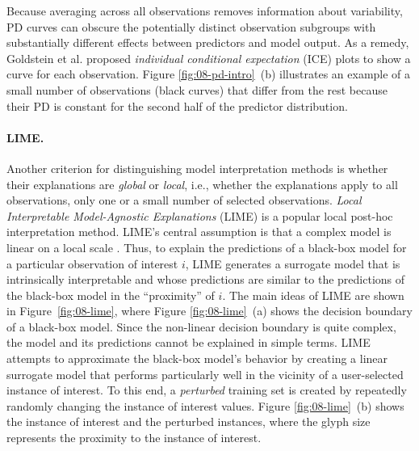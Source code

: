 \documentclass[
  oneside]{book}
\begin{document}
Because averaging across all observations removes information about variability, PD curves can obscure the potentially distinct observation subgroups with substantially different effects between predictors and model output.
As a remedy, Goldstein et al. \autocite{Goldstein:ICE2015} proposed \emph{individual conditional expectation} (ICE) plots to show a curve for each observation.
Figure \ref{fig:08-pd-intro}~(b) illustrates an example of a small number of observations (black curves) that differ from the rest because their PD is constant for the second half of the predictor distribution.

\paragraph*{LIME.}

Another criterion for distinguishing model interpretation methods is whether their explanations are \emph{global} or \emph{local}, i.e., whether the explanations apply to all observations, only one or a small number of selected observations.
\emph{Local Interpretable Model-Agnostic Explanations} \autocite{RibeiroEtAl:KDD2016} (LIME) is a popular local post-hoc interpretation method.
LIME's central assumption is that a complex model is linear on a local scale \autocite{RibeiroEtAl:KDD2016}.
Thus, to explain the predictions of a black-box model for a particular observation of interest \(i\), LIME generates a surrogate model that is intrinsically interpretable and whose predictions are similar to the predictions of the black-box model in the ``proximity'' of \(i\).
The main ideas of LIME are shown in Figure~\ref{fig:08-lime}, where Figure \ref{fig:08-lime}~(a) shows the decision boundary of a black-box model.
Since the non-linear decision boundary is quite complex, the model and its predictions cannot be explained in simple terms.
LIME attempts to approximate the black-box model's behavior by creating a linear surrogate model that performs particularly well in the vicinity of a user-selected instance of interest.
To this end, a \emph{perturbed} training set is created by repeatedly randomly changing the instance of interest values.
Figure \ref{fig:08-lime}~(b) shows the instance of interest and the perturbed instances, where the glyph size represents the proximity to the instance of interest.
\end{document}
